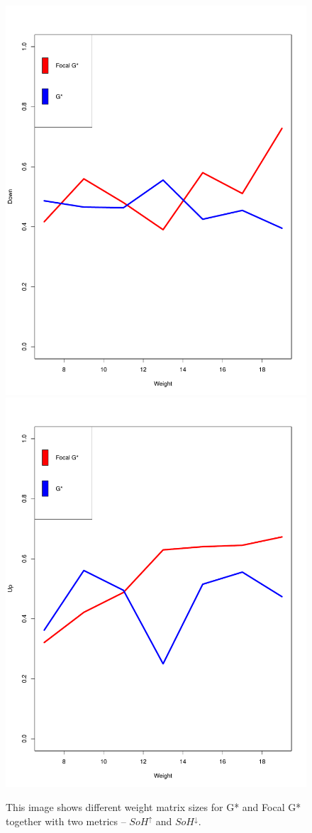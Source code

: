\documentclass{itatnew}
\begin{document}
\begin{figure}[htp]
  \includegraphics[width=.45\linewidth]{images/gen-blur-sohdown-1}
  \hspace{1em}
  \includegraphics[width=.45\linewidth]{images/gen-blur-sohup-1}
  
  \caption{
    This image shows different weight matrix sizes for G* and Focal G* together 
    with two metrics -- $SoH^\uparrow$ and $SoH^\downarrow$.
  }
  \label{fig:Blur}
\end{figure}
\end{document}
